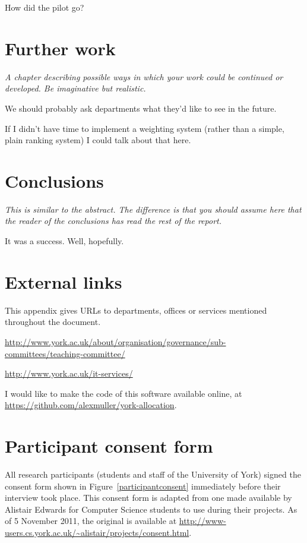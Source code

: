 \documentclass[]{scrartcl}
\begin{document}
How did the pilot go?

\section{Further work}

\textit{A chapter describing possible ways in which your work could be continued or developed. Be imaginative but realistic.}

We should probably ask departments what they'd like to see in the future.

If I didn't have time to implement a weighting system (rather than a simple, plain ranking system) I could talk about that here.

\section{Conclusions}

\textit{This is similar to the abstract. The difference is that you should assume here that the reader of the conclusions has read the rest of the report.}

It was a success. Well, hopefully.

\appendix


\newpage
\section{External links}

This appendix gives URLs to departments, offices or services mentioned throughout the document.

\url{http://www.york.ac.uk/about/organisation/governance/sub-committees/teaching-committee/}

\url{http://www.york.ac.uk/it-services/}

I would like to make the code of this software available online, at \url{https://github.com/alexmuller/york-allocation}.

\newpage
\section{Participant consent form}
\label{sec:consent}

All research participants (students and staff of the University of York)
signed the consent form shown in Figure~\ref{participantconsent} immediately
before their interview took place. This consent form is adapted from one made
available by Alistair Edwards for Computer Science students to use during
their projects. As of 5 November 2011, the original is available at
\url{http://www-users.cs.york.ac.uk/~alistair/projects/consent.html}.
\end{document}
